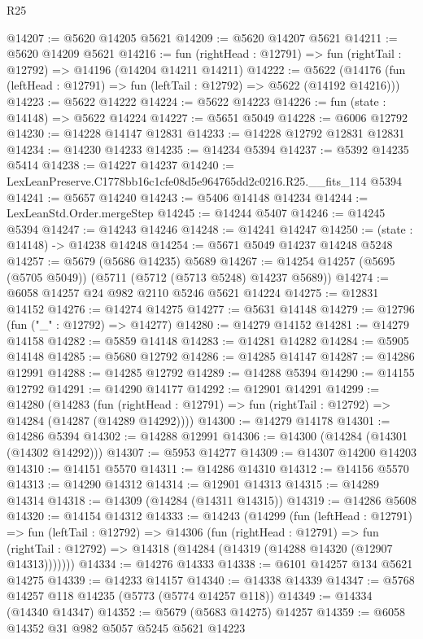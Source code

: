 \begin{lexlean}{R25}
\begin{coremodule}
@14207 := @5620 @14205 @5621
@14209 := @5620 @14207 @5621
@14211 := @5620 @14209 @5621
@14216 := fun (rightHead : @12791) => fun (rightTail : @12792) => @14196 (@14204 @14211 @14211)
@14222 := @5622
    (@14176 (fun (leftHead : @12791) => fun (leftTail : @12792) => @5622 (@14192 @14216)))
@14223 := @5622 @14222
@14224 := @5622 @14223
@14226 := fun (state : @14148) => @5622 @14224
@14227 := @5651 @5049
@14228 := @6006 @12792
@14230 := @14228 @14147 @12831
@14233 := @14228 @12792 @12831 @12831
@14234 := @14230 @14233
@14235 := @14234 @5394
@14237 := @5392 @14235 @5414
@14238 := @14227 @14237
@14240 := LexLeanPreserve.C1778bb16c1cfe08d5e964765dd2c0216.R25.__fits_114 @5394
@14241 := @5657 @14240
@14243 := @5406 @14148 @14234
@14244 := LexLeanStd.Order.mergeStep
@14245 := @14244 @5407
@14246 := @14245 @5394
@14247 := @14243 @14246
@14248 := @14241 @14247
@14250 := (state : @14148) -> @14238 @14248
@14254 := @5671 @5049 @14237 @14248 @5248
@14257 := @5679 (@5686 @14235) @5689
@14267 := @14254 @14257 (@5695 (@5705 @5049)) (@5711 (@5712 (@5713 @5248) @14237 @5689))
@14274 := @6058 @14257 @24 @982 @2110 @5246 @5621 @14224
@14275 := @12831 @14152
@14276 := @14274 @14275
@14277 := @5631 @14148
@14279 := @12796 (fun ("_" : @12792) => @14277)
@14280 := @14279 @14152
@14281 := @14279 @14158
@14282 := @5859 @14148
@14283 := @14281 @14282
@14284 := @5905 @14148
@14285 := @5680 @12792
@14286 := @14285 @14147
@14287 := @14286 @12991
@14288 := @14285 @12792
@14289 := @14288 @5394
@14290 := @14155 @12792
@14291 := @14290 @14177
@14292 := @12901 @14291
@14299 := @14280
    (@14283
      (fun (rightHead : @12791) => fun (rightTail : @12792) => @14284 (@14287 (@14289 @14292))))
@14300 := @14279 @14178
@14301 := @14286 @5394
@14302 := @14288 @12991
@14306 := @14300 (@14284 (@14301 (@14302 @14292)))
@14307 := @5953 @14277
@14309 := @14307 @14200 @14203
@14310 := @14151 @5570
@14311 := @14286 @14310
@14312 := @14156 @5570
@14313 := @14290 @14312
@14314 := @12901 @14313
@14315 := @14289 @14314
@14318 := @14309 (@14284 (@14311 @14315))
@14319 := @14286 @5608
@14320 := @14154 @14312
@14333 := @14243
    (@14299
      (fun (leftHead : @12791) =>
      fun (leftTail : @12792) =>
      @14306
        (fun (rightHead : @12791) =>
        fun (rightTail : @12792) => @14318 (@14284 (@14319 (@14288 @14320 (@12907 @14313)))))))
@14334 := @14276 @14333
@14338 := @6101 @14257 @134 @5621 @14275
@14339 := @14233 @14157
@14340 := @14338 @14339
@14347 := @5768 @14257 @118 @14235 (@5773 (@5774 @14257 @118))
@14349 := @14334 (@14340 @14347)
@14352 := @5679 (@5683 @14275) @14257
@14359 := @6058 @14352 @31 @982 @5057 @5245 @5621 @14223

\end{coremodule}
\end{lexlean}
